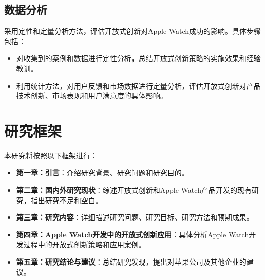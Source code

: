 \subsection{数据分析}

采用定性和定量分析方法，评估开放式创新对Apple Watch成功的影响。具体步骤包括：
\begin{itemize}
    \item 对收集到的案例和数据进行定性分析，总结开放式创新策略的实施效果和经验教训\citep{chesbrough2016}。
    \item 利用统计方法，对用户反馈和市场数据进行定量分析，评估开放式创新对产品技术创新、市场表现和用户满意度的具体影响\citep{gehani2016corporate,apple2024}。
\end{itemize}

\section{研究框架}

本研究将按照以下框架进行：
\begin{itemize}
    \item \textbf{第一章：引言}：介绍研究背景、研究问题和研究目的。
    \item \textbf{第二章：国内外研究现状}：综述开放式创新和Apple Watch产品开发的现有研究，指出研究不足和空白。
    \item \textbf{第三章：研究内容}：详细描述研究问题、研究目标、研究方法和预期成果。
    \item \textbf{第四章：Apple Watch开发中的开放式创新应用}：具体分析Apple Watch开发过程中的开放式创新策略和应用案例。
    \item \textbf{第五章：研究结论与建议}：总结研究发现，提出对苹果公司及其他企业的建议。
\end{itemize}
